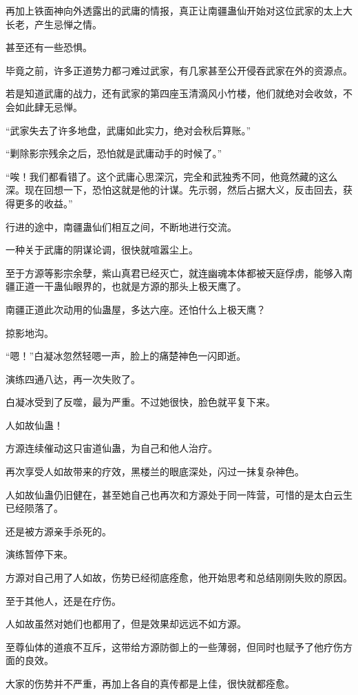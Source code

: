 \begin{this_body}
再加上铁面神向外透露出的武庸的情报，真正让南疆蛊仙开始对这位武家的太上大长老，产生忌惮之情。

甚至还有一些恐惧。

毕竟之前，许多正道势力都刁难过武家，有几家甚至公开侵吞武家在外的资源点。

若是知道武庸的战力，还有武家的第四座玉清滴风小竹楼，他们就绝对会收敛，不会如此肆无忌惮。

“武家失去了许多地盘，武庸如此实力，绝对会秋后算账。”

“剿除影宗残余之后，恐怕就是武庸动手的时候了。”

“唉！我们都看错了。这个武庸心思深沉，完全和武独秀不同，他竟然藏的这么深。现在回想一下，恐怕这就是他的计谋。先示弱，然后占据大义，反击回去，获得更多的收益。”

行进的途中，南疆蛊仙们相互之间，不断地进行交流。

一种关于武庸的阴谋论调，很快就喧嚣尘上。

至于方源等影宗余孽，紫山真君已经灭亡，就连幽魂本体都被天庭俘虏，能够入南疆正道一干蛊仙眼界的，也就是方源的那头上极天鹰了。

南疆正道此次动用的仙蛊屋，多达六座。还怕什么上极天鹰？

掠影地沟。

“嗯！”白凝冰忽然轻嗯一声，脸上的痛楚神色一闪即逝。

演练四通八达，再一次失败了。

白凝冰受到了反噬，最为严重。不过她很快，脸色就平复下来。

人如故仙蛊！

方源连续催动这只宙道仙蛊，为自己和他人治疗。

再次享受人如故带来的疗效，黑楼兰的眼底深处，闪过一抹复杂神色。

人如故仙蛊仍旧健在，甚至她自己也再次和方源处于同一阵营，可惜的是太白云生已经陨落了。

还是被方源亲手杀死的。

演练暂停下来。

方源对自己用了人如故，伤势已经彻底痊愈，他开始思考和总结刚刚失败的原因。

至于其他人，还是在疗伤。

人如故虽然对她们也都用了，但是效果却远远不如方源。

至尊仙体的道痕不互斥，这带给方源防御上的一些薄弱，但同时也赋予了他疗伤方面的良效。

大家的伤势并不严重，再加上各自的真传都是上佳，很快就都痊愈。


\end{this_body}

